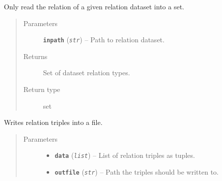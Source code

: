 \documentclass[letterpaper,10pt,english]{sphinxmanual}
\begin{document}

\begin{fulllineitems}
\label{src.trans_e:src.trans_e.partition_data.partition_whole}
\end{fulllineitems}


\begin{fulllineitems}
\label{src.trans_e:src.trans_e.partition_data.read_only_relations_into_set}
Only read the relation of a given relation dataset into a set.
\begin{quote}\begin{description}
\item[{Parameters}] \leavevmode
\textbf{\texttt{inpath}} (\emph{\texttt{str}}) -- Path to relation dataset.

\item[{Returns}] \leavevmode
Set of dataset relation types.

\item[{Return type}] \leavevmode
set

\end{description}\end{quote}

\end{fulllineitems}


\begin{fulllineitems}
\label{src.trans_e:src.trans_e.partition_data.write_data_in_file}
Writes relation triples into a file.
\begin{quote}\begin{description}
\item[{Parameters}] \leavevmode\begin{itemize}
\item {} 
\textbf{\texttt{data}} (\emph{\texttt{list}}) -- List of relation triples as tuples.

\item {} 
\textbf{\texttt{outfile}} (\emph{\texttt{str}}) -- Path the triples should be written to.

\end{itemize}

\end{description}\end{quote}

\end{fulllineitems}
\end{document}
